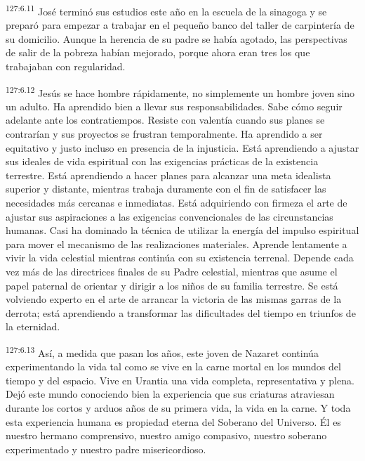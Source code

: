 \par
\textsuperscript{127:6.11} José terminó sus estudios este año en la escuela de la sinagoga y se preparó para empezar a trabajar en el pequeño banco del taller de carpintería de su domicilio. Aunque la herencia de su padre se había agotado, las perspectivas de salir de la pobreza habían mejorado, porque ahora eran tres los que trabajaban con regularidad.

\par
\textsuperscript{127:6.12} Jesús se hace hombre rápidamente, no simplemente un hombre joven sino un adulto. Ha aprendido bien a llevar sus responsabilidades. Sabe cómo seguir adelante ante los contratiempos. Resiste con valentía cuando sus planes se contrarían y sus proyectos se frustran temporalmente. Ha aprendido a ser equitativo y justo incluso en presencia de la injusticia. Está aprendiendo a ajustar sus ideales de vida espiritual con las exigencias prácticas de la existencia terrestre. Está aprendiendo a hacer planes para alcanzar una meta idealista superior y distante, mientras trabaja duramente con el fin de satisfacer las necesidades más cercanas e inmediatas. Está adquiriendo con firmeza el arte de ajustar sus aspiraciones a las exigencias convencionales de las circunstancias humanas. Casi ha dominado la técnica de utilizar la energía del impulso espiritual para mover el mecanismo de las realizaciones materiales. Aprende lentamente a vivir la vida celestial mientras continúa con su existencia terrenal. Depende cada vez más de las directrices finales de su Padre celestial, mientras que asume el papel paternal de orientar y dirigir a los niños de su familia terrestre. Se está volviendo experto en el arte de arrancar la victoria de las mismas garras de la derrota; está aprendiendo a transformar las dificultades del tiempo en triunfos de la eternidad.

\par
\textsuperscript{127:6.13} Así, a medida que pasan los años, este joven de Nazaret continúa experimentando la vida tal como se vive en la carne mortal en los mundos del tiempo y del espacio. Vive en Urantia una vida completa, representativa y plena. Dejó este mundo conociendo bien la experiencia que sus criaturas atraviesan durante los cortos y arduos años de su primera vida, la vida en la carne. Y toda esta experiencia humana es propiedad eterna del Soberano del Universo. Él es nuestro hermano comprensivo, nuestro amigo compasivo, nuestro soberano experimentado y nuestro padre misericordioso.

